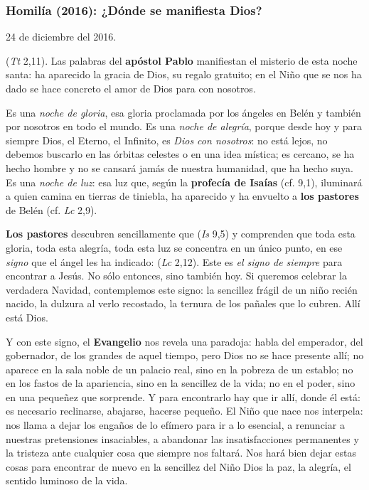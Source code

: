 \begin{body}
\begin{body}
\subsubsection{Homilía (2016): ¿Dónde se manifiesta Dios?}

24 de diciembre del 2016.

 (\emph{Tt} 2,11). Las palabras del \textbf{apóstol Pablo} manifiestan el misterio de esta noche santa: ha aparecido la gracia de Dios, su regalo gratuito; en el Niño que se nos ha dado se hace concreto el amor de Dios para con nosotros.

Es una \emph{noche de gloria}, esa gloria proclamada por los ángeles en Belén y también por nosotros en todo el mundo. Es una \emph{noche de alegría}, porque desde hoy y para siempre Dios, el Eterno, el Infinito, es \emph{Dios con nosotros}: no está lejos, no debemos buscarlo en las órbitas celestes o en una idea mística; es cercano, se ha hecho hombre y no se cansará jamás de nuestra humanidad, que ha hecho suya. Es una \emph{noche de luz}: esa luz que, según la \textbf{profecía de Isaías} (cf. 9,1), iluminará a quien camina en tierras de tiniebla, ha aparecido y ha envuelto a \textbf{los pastores} de Belén (cf. \emph{Lc} 2,9).

\textbf{Los pastores} descubren sencillamente que  (\emph{Is} 9,5) y comprenden que toda esta gloria, toda esta alegría, toda esta luz se concentra en un único punto, en ese \emph{signo} que el ángel les ha indicado:  (\emph{Lc} 2,12). Este es \emph{el signo de siempre} para encontrar a Jesús. No sólo entonces, sino también hoy. Si queremos celebrar la verdadera Navidad, contemplemos este signo: la sencillez frágil de un niño recién nacido, la dulzura al verlo recostado, la ternura de los pañales que lo cubren. Allí está Dios.

Y con este signo, el \textbf{Evangelio} nos revela una paradoja: habla del emperador, del gobernador, de los grandes de aquel tiempo, pero Dios no se hace presente allí; no aparece en la sala noble de un palacio real, sino en la pobreza de un establo; no en los fastos de la apariencia, sino en la sencillez de la vida; no en el poder, sino en una pequeñez que sorprende. Y para encontrarlo hay que ir allí, donde él está: es necesario reclinarse, abajarse, hacerse pequeño. El Niño que nace nos interpela: nos llama a dejar los engaños de lo efímero para ir a lo esencial, a renunciar a nuestras pretensiones insaciables, a abandonar las insatisfacciones permanentes y la tristeza ante cualquier cosa que siempre nos faltará. Nos hará bien dejar estas cosas para encontrar de nuevo en la sencillez del Niño Dios la paz, la alegría, el sentido luminoso de la vida.


\end{body}
\end{body}
